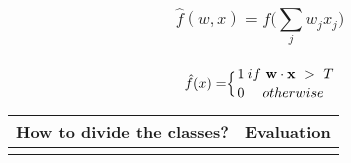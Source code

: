 \documentclass[11pt]{article}
\begin{document}
    \subsubsection{\texorpdfstring{\[\hat{f}(w,x) = f\bigg(\sum_{j}w_jx_j\bigg)\]}{\textbackslash{}hat\{f\}(w,x) = f\textbackslash{}bigg(\textbackslash{}sum\_\{j\}w\_jx\_j\textbackslash{}bigg)}}\label{hatfwx-fbiggsum_jw_jx_jbigg}

\subsubsection{\texorpdfstring{\[ \hat{f}(x) = \Bigr\{ { 1 \atop 0}  {if \ \textbf{w} \cdot \textbf{x} \ > \ T\atop \ otherwise} \]}{ \textbackslash{}hat\{f\}(x) = \textbackslash{}Bigr\textbackslash{}\{ \{ 1 \textbackslash{}atop 0\}  \{if \textbackslash{} \textbackslash{}textbf\{w\} \textbackslash{}cdot \textbackslash{}textbf\{x\} \textbackslash{} \textgreater{} \textbackslash{} T\textbackslash{}atop \textbackslash{} otherwise\} }}\label{hatfx-bigr-1-atop-0-if-textbfw-cdot-textbfx-tatop-otherwise}

\begin{longtable}[]{@{}ll@{}}
\toprule
How to divide the classes? & Evaluation\tabularnewline
\midrule
\endhead
&\tabularnewline
\bottomrule
\end{longtable}
\end{document}
